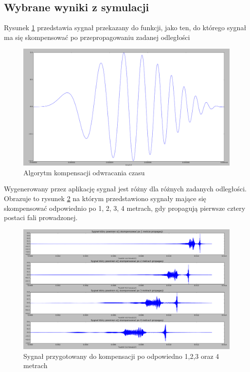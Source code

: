 \subsection{Wybrane wyniki z symulacji}
Rysunek \ref{fig:sygnal we} przedstawia sygnał przekazany do funkcji, jako ten, do którego sygnał ma się skompensować po przepropagowaniu zadanej odległości
\begin{figure}[h]
\centering
\includegraphics[width=14cm]{Zdjecia/4/test_chirp}
\caption{Algorytm kompensacji odwracania czasu}
\label{fig:sygnal we}
\end{figure}
Wygenerowany przez aplikację sygnał jest różny dla różnych zadanych odległości. Obrazuje to rysunek \ref{fig:rozne_odl} na którym przedstawiono sygnały mające się skompensować odpowiednio po 1, 2, 3, 4 metrach, gdy propagują pierwsze cztery postaci fali prowadzonej. 
\begin{figure}[h]
\centering
\includegraphics[width=14cm]{Zdjecia/4/tr_przykl}
\caption{Sygnał przygotowany do kompensacji po odpowiedno 1,2,3 oraz 4 metrach}
\label{fig:rozne_odl}
\end{figure}
